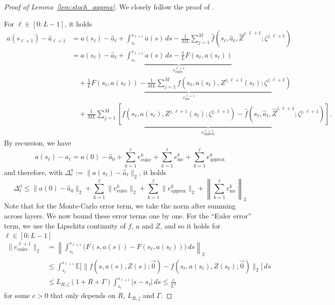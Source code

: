 \documentclass[a4paper,11pt]{article}
\newcommand{\1}{\mathbbm{1}}
\theoremstyle{definition}
\theoremstyle{remark}
\begin{document}
\begin{proof}[Proof of Lemma~\ref{lem:stoch_approx}]
We closely follow the proof of \cite[Lemma 5.4]{chizat2025hidden}.

For $\ell \in [0:L-1]$, it holds
\begin{align*}
a(s_{\ell+1}) - \hat{a}_{\ell+1}
&= a(s_\ell) - \hat{a}_\ell
  + \int_{s_\ell}^{s_{\ell+1}} \dot{a}(s)\, ds
  - \frac{1}{ML} \sum_{j=1}^{M} \hat{f}(s_\ell, \hat{a}_\ell, \hat{Z}^{j,\ell+1}{;\zeta^{j,\ell+1}}) \\
&= a(s_\ell) - \hat{a}_\ell
  + \underbrace{
      \int_{s_\ell}^{s_{\ell+1}} \dot{a}(s)\, ds - \frac{1}{L} F(s_\ell, a(s_\ell))
    }_{e^{\ell+1}_{\mathrm{euler}}} \\
&\quad + \underbrace{
      \frac{1}{L} F(s_\ell, a(s_\ell))
      - \frac{1}{ML} \sum_{j=1}^{M} f(s_\ell, a(s_\ell), Z^{j,\ell+1}(s_\ell){;\zeta^{j,\ell+1}})
    }_{e^{\ell+1}_{\mathrm{mc}}} \\
&\quad + \underbrace{
      \frac{1}{ML} \sum_{j=1}^{M}
      \left[ f(s_\ell, a(s_\ell), Z^{j,\ell+1}(s_\ell){;\zeta^{j,\ell+1}})
      - \hat{f}(s_\ell, \hat{a}_\ell, \hat{Z}^{j,\ell+1}{;\zeta^{j,\ell+1}}) \right]
    }_{e^{\ell+1}_{\mathrm{approx}}}.
\end{align*}
By recursion, we have
\[
  a(s_\ell) - \hat{a}_\ell
  = a(0) - \hat{a}_0
  + \sum_{k=1}^{\ell} e^k_{\mathrm{euler}}
  + \sum_{k=1}^{\ell} e^k_{\mathrm{mc}}
  + \sum_{k=1}^{\ell} e^k_{\mathrm{approx}}
\]
and therefore, with $\Delta^a_\ell := \|a(s_\ell) - \hat{a}_\ell\|_2$, it holds
\begin{equation}\label{eq:error_control_stoch_approx}
    \Delta^a_\ell
  \leq \|a(0) - \hat{a}_0\|_2
  + \sum_{k=1}^{\ell} \|e^k_{\mathrm{euler}}\|_2
  + \sum_{k=1}^{\ell} \|e^k_{\mathrm{approx}}\|_2
  + \left\| \sum_{k=1}^{\ell} e^k_{\mathrm{mc}} \right\|_2
\end{equation}
Note that for the Monte-Carlo error term, we take the norm after summing across layers.
We now bound these error terms one by one. For the ``Euler error'' term, we use the Lipschitz continuity of $f$,
$a$ and $Z$, and so it holds for $\ell \in [0:L-1]$
\begin{align*}
\|e^{\ell+1}_{\mathrm{euler}}\|_2
&= \left\| \int_{s_\ell}^{s_{\ell+1}}
   \bigl( F(s, a(s)) - F(s_\ell, a(s_\ell)) \bigr)\, ds \right\|_2 \\
&\leq \int_{s_\ell}^{s_{\ell+1}}
  \mathbb{E}\bigl[\|f(s, a(s), Z(s){;\vec{0}}) - f(s_\ell, a(s_\ell), Z(s_\ell){;\vec{0}})\|_2\bigr]\, ds \\
&\leq L_{R{, \zeta}}(1 + R + \Gamma)
  \int_{s_\ell}^{s_{\ell+1}} |s - s_\ell|\, ds
  \leq \frac{c}{L^2}
\end{align*}
for some $c > 0$ that only depends on $R$, $L_{R{, \zeta}}$ and $\Gamma$. 


\end{proof}
\end{document}
